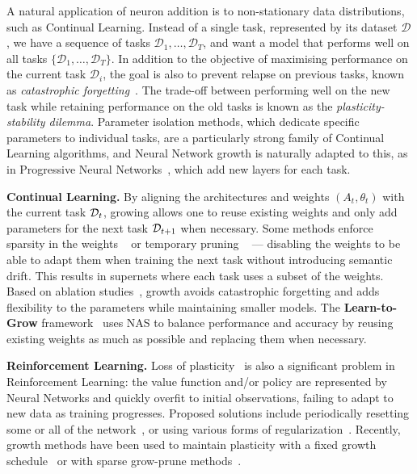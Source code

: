 A natural application of neuron addition is to non-stationary data distributions, such as Continual Learning. Instead of a single task, represented by its dataset $\mathcal{D}$, we have a sequence of tasks $\mathcal{D}_1, \dots, \mathcal{D}_T$, and want a model that performs well on all tasks $\{\mathcal{D}_1, \dots, \mathcal{D}_T\}$. In addition to the objective of maximising performance on the current task $\mathcal{D}_i$, the goal is also to prevent relapse on previous tasks, known as \emph{catastrophic forgetting}~\citep{lange_continual_2021}. The trade-off between performing well on the new task while retaining performance on the old tasks is known as the \emph{plasticity-stability dilemma}. Parameter isolation methods, which dedicate specific parameters to individual tasks, are a particularly strong family of Continual Learning algorithms, and Neural Network growth is naturally adapted to this, as in Progressive Neural Networks~\citep{rusu_progressive_2016}, which add new layers for each task.

\textbf{Continual Learning.} By aligning the architectures and weights $(A_t, \theta_t)$ with the current task $\mathcal{D}_t$, growing allows one to reuse existing weights and only add parameters for the next task $\mathcal{D}_{t+1}$ when necessary. Some methods enforce sparsity in the weights ~\citep{yoon_lifelong_2018,yang_grown_2021} or temporary pruning ~\citep{hung_CPG_2019,wu_firefly_2020} --- disabling the weights to be able to adapt them when training the next task without introducing semantic drift. This results in supernets where each task uses a subset of the weights. Based on ablation studies~\citep{yoon_lifelong_2018}, growth avoids catastrophic forgetting and adds flexibility to the parameters while maintaining smaller models. The \textbf{Learn-to-Grow} framework~\citep{li_learn_2019} uses NAS to balance performance and accuracy by reusing existing weights as much as possible and replacing them when necessary.

\textbf{Reinforcement Learning.} Loss of plasticity~\citep{dohare_loss_2024} is also a significant problem in Reinforcement Learning: the value function and/or policy are represented by Neural Networks and quickly overfit to initial observations, failing to adapt to new data as training progresses. Proposed solutions include periodically resetting some or all of the network~\citep{nikishin_primacy_2022,sokar_dormant_2023}, or using various forms of regularization~\citep{bhatt_crossq_2024,galliciSimplifyingDeepTemporal2025}. 
Recently, growth methods have been used to maintain plasticity with a fixed growth schedule~\citep{kangForgetandGrowStrategyDeep2025} or with sparse grow-prune methods~\citep{liu_neuroplastic_2025}.
